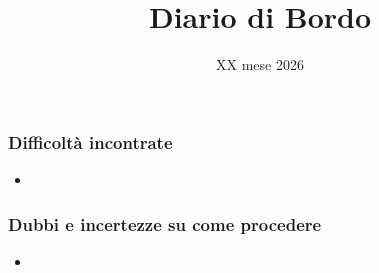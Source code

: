 \documentclass{beamer}
\title[DdB]{Diario di Bordo}
\author[Team Three Technologies]{}
\institute[]{Team Three Technologies}
\date{XX mese 2026}
\begin{document}
    {
    \begin{frame}[plain]
        \titlepage
    \end{frame}
    }
    \begin{frame}
        \frametitle{\textbf{Difficoltà incontrate}}
        \begin{itemize}
            \item 
        \end{itemize}
    \end{frame}
    \begin{frame}
        \frametitle{\textbf{Dubbi e incertezze su come procedere}}
        \begin{itemize}
            \item 
        \end{itemize}
    \end{frame}
\end{document}
